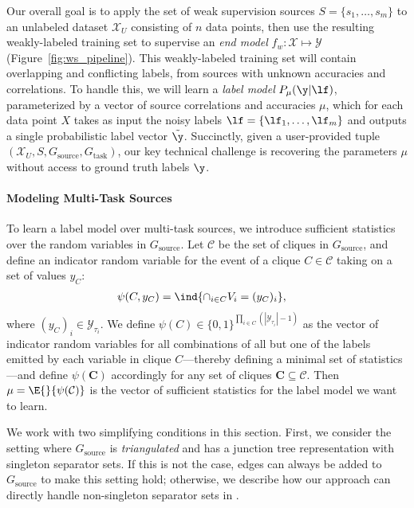 \documentclass[letterpaper]{article}
\begin{document}
Our overall goal is to apply the set of weak supervision sources $S = \{s_1, \ldots, s_m\}$ to an unlabeled dataset $\mathcal{X}_U$ consisting of $n$ data points, then use the resulting weakly-labeled training set to supervise an \textit{end model} $f_w : \mathcal{X} \mapsto \mathcal{Y}$ (Figure~\ref{fig:ws_pipeline}).
This weakly-labeled training set will contain overlapping and conflicting labels, from sources with unknown accuracies and correlations.
To handle this, we will learn a \textit{label model} $P_\mu(\y|\lf)$, parameterized by a vector of source correlations and accuracies $\mu$, which for each data point $X$ takes as input the noisy labels $\lf = \{\lf_1, \ldots, \lf_m\}$ and outputs a single probabilistic label vector $\tilde{\y}$.
Succinctly, given a user-provided tuple $(\mathcal{X}_U, S, G_{\text{source}}, G_{\text{task}})$, our key technical challenge is recovering the parameters $\mu$ without access to ground truth labels $\y$.

\paragraph*{Modeling Multi-Task Sources}
To learn a label model over multi-task sources, we introduce sufficient statistics over the random variables in $G_{\text{source}}$.
Let $\mathcal{C}$ be the set of cliques in $G_{\text{source}}$, and define an indicator random variable for the event of a clique $C \in \mathcal{C}$ taking on a set of values $y_C$:
\begin{align*}
	\psi(C,y_C)
	&=
	\ind{ \cap_{i \in C} V_i = (y_C)_i },
\end{align*}
where $(y_C)_i \in \mathcal{Y}_{\tau_i}$.
We define $\psi(C) \in \{0,1\}^{\prod_{i\in C} (|\mathcal{Y}_{\tau_i}|-1)}$ as the vector of indicator random variables for all combinations of all but one of the labels emitted by each variable in clique $C$---thereby defining a minimal set of statistics---and define $\psi(\textbf{C})$ accordingly for any set of cliques $\textbf{C} \subseteq \mathcal{C}$.
Then $\mu = \E{}{ \psi(\mathcal{C}) }$ is the vector of sufficient statistics for the label model we want to learn.

We work with two simplifying conditions in this section.
First, we consider the setting where $G_{\text{source}}$ is \textit{triangulated} and has a junction tree representation with singleton separator sets.
If this is not the case, edges can always be added to $G_{\text{source}}$ to make this setting hold; otherwise, we describe how our approach can directly handle non-singleton separator sets in .
\end{document}
